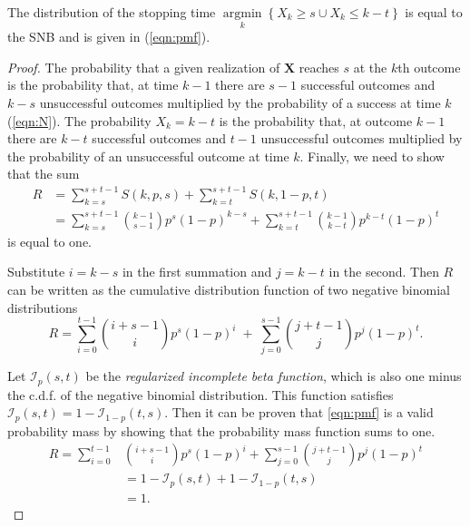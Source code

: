 \documentclass[12pt]{article}         %
\DeclareMathOperator*{\argmin}{argmin}
\newcommand*{\argminl}{\argmin\limits}
\begin{document}
\begin{prop}
The distribution of the stopping time 
$\argminl_k \left\{ X_k \geq s \cup X_k \leq k-t \right\}$ 
is equal to the SNB and is given in (\ref{eqn:pmf}). 
\end{prop}
\begin{proof}

The probability that a given realization of $\mathbf{X}$ reaches $s$ at 
the $k$th outcome is the probability that, at time $k-1$ there are $s-1$ 
successful outcomes and $k-s$ unsuccessful outcomes multiplied by 
the probability of a 
success at time $k$ (\ref{eqn:N}). The probability $X_k = k-t$ 
is the probability that, at outcome $k-1$ there are $k-t$ successful outcomes 
and $t-1$ unsuccessful outcomes multiplied by the probability of an 
unsuccessful outcome at time $k$.  Finally, we need to show that 
the sum
\begin{align} \label{eqn:sum_proof}
R &= \sum_{k=s}^{s+t-1} S(k, p, s) + \sum_{k=t}^{s+t-1} S(k, 1-p, t) \\
  &= \sum_{k=s}^{s+t-1} {k-1 \choose s-1} p^s (1-p)^{k-s} + \sum_{k=t}^{s+t-1} {k-1 \choose k-t} p^{k-t} (1-p)^t
\end{align}
is equal to one.

Substitute $i=k-s$ in the first summation and
$j=k-t$ in the second. 
Then $R$ can be written
as the cumulative distribution function of two 
negative binomial distributions
\begin{equation} \label{eqn:transformed_sum}
R = \sum_{i=0}^{t-1} {i+s-1 \choose i} p^s (1-p)^i \; + \;
\sum_{j=0}^{s-1} {j+t-1 \choose j} p^j (1-p)^t.
\end{equation}

Let $\mathcal{I}_p(s, t)$ be the {\em regularized incomplete beta function}, which is 
also one minus the c.d.f. of the negative binomial distribution. This
function satisfies $\mathcal{I}_p(s, t) = 1-\mathcal{I}_{1-p}(t, s)$.  
Then it can be proven
that \ref{eqn:pmf} is a valid probability mass by showing that the
probability mass function sums to one.
\begin{align*}
R = \sum_{i=0}^{t-1} &{i+s-1 \choose i} p^s (1-p)^i +
\sum_{j=0}^{s-1}  {j+t-1 \choose j} p^j  (1-p)^t \\
   &= 1-\mathcal{I}_p(s, t) + 1 - \mathcal{I}_{1-p}(t, s) \\
   &= 1. 
\end{align*}
\end{proof}
\end{document}
